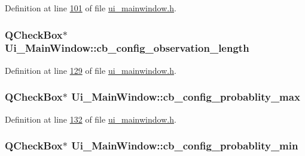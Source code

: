 Definition at line \hyperlink{a00052_source_l00101}{101} of file \hyperlink{a00052_source}{ui\+\_\+mainwindow.\+h}.

\hypertarget{a00027_ae9e8f3f0d147a4cd21c8f36ffb3bd81f}{
\subsubsection[{cb\+\_\+config\+\_\+observation\+\_\+length}]{\setlength{\rightskip}{0pt plus 5cm}Q\+Check\+Box$\ast$ Ui\+\_\+\+Main\+Window\+::cb\+\_\+config\+\_\+observation\+\_\+length}}\label{a00027_ae9e8f3f0d147a4cd21c8f36ffb3bd81f}


Definition at line \hyperlink{a00052_source_l00129}{129} of file \hyperlink{a00052_source}{ui\+\_\+mainwindow.\+h}.

\hypertarget{a00027_ad0a7ea02564c112595f0d30efa75eef2}{
\subsubsection[{cb\+\_\+config\+\_\+probablity\+\_\+max}]{\setlength{\rightskip}{0pt plus 5cm}Q\+Check\+Box$\ast$ Ui\+\_\+\+Main\+Window\+::cb\+\_\+config\+\_\+probablity\+\_\+max}}\label{a00027_ad0a7ea02564c112595f0d30efa75eef2}


Definition at line \hyperlink{a00052_source_l00132}{132} of file \hyperlink{a00052_source}{ui\+\_\+mainwindow.\+h}.

\hypertarget{a00027_a6e32cc42adcf308df94cbbc9ac226f50}{
\subsubsection[{cb\+\_\+config\+\_\+probablity\+\_\+min}]{\setlength{\rightskip}{0pt plus 5cm}Q\+Check\+Box$\ast$ Ui\+\_\+\+Main\+Window\+::cb\+\_\+config\+\_\+probablity\+\_\+min}}\label{a00027_a6e32cc42adcf308df94cbbc9ac226f50}


